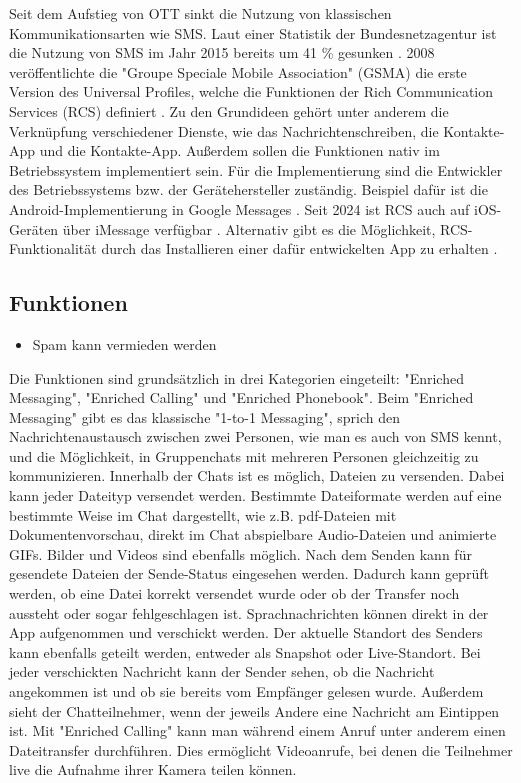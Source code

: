 \documentclass[conference]{IEEEtran}
\begin{document}
Seit dem Aufstieg von OTT sinkt die Nutzung von klassischen Kommunikationsarten wie SMS.
Laut einer Statistik der Bundesnetzagentur ist die Nutzung von SMS im Jahr 2015 bereits um 41 \% gesunken \cite{ottmobinter}.
2008 veröffentlichte die "Groupe Speciale Mobile Association" (GSMA) die erste Version des Universal Profiles, welche die Funktionen der Rich Communication Services (RCS) definiert \cite{rcsuite}.
Zu den Grundideen gehört unter anderem die Verknüpfung verschiedener Dienste, wie das Nachrichtenschreiben, die Kontakte-App und die Kontakte-App.
Außerdem sollen die Funktionen nativ im Betriebssystem implementiert sein.
Für die Implementierung sind die Entwickler des Betriebssystems bzw. der Gerätehersteller zuständig.
Beispiel dafür ist die Android-Implementierung in Google Messages \cite{googlemessages}.
Seit 2024 ist RCS auch auf iOS-Geräten über iMessage verfügbar \cite{applemessages}.
Alternativ gibt es die Möglichkeit, RCS-Funktionalität durch das Installieren einer dafür entwickelten App zu erhalten \cite{uniprof}.

\subsection{Funktionen}

\begin{itemize}
    \item Spam kann vermieden werden
\end{itemize}
\cite{uniprof}

Die Funktionen sind grundsätzlich in drei Kategorien eingeteilt: "Enriched Messaging", "Enriched Calling" und "Enriched Phonebook".
Beim "Enriched Messaging" gibt es das klassische "1-to-1 Messaging", sprich den Nachrichtenaustausch zwischen zwei Personen, wie man es auch von SMS kennt, und die Möglichkeit, in Gruppenchats mit mehreren Personen gleichzeitig zu kommunizieren.
Innerhalb der Chats ist es möglich, Dateien zu versenden.
Dabei kann jeder Dateityp versendet werden. Bestimmte Dateiformate werden auf eine bestimmte Weise im Chat dargestellt, wie z.B. pdf-Dateien mit Dokumentenvorschau, direkt im Chat abspielbare Audio-Dateien und animierte GIFs.
Bilder und Videos sind ebenfalls möglich.
Nach dem Senden kann für gesendete Dateien der Sende-Status eingesehen werden.
Dadurch kann geprüft werden, ob eine Datei korrekt versendet wurde oder ob der Transfer noch aussteht oder sogar fehlgeschlagen ist.
Sprachnachrichten können direkt in der App aufgenommen und verschickt werden.
Der aktuelle Standort des Senders kann ebenfalls geteilt werden, entweder als Snapshot oder Live-Standort.
Bei jeder verschickten Nachricht kann der Sender sehen, ob die Nachricht angekommen ist und ob sie bereits vom Empfänger gelesen wurde.
Außerdem sieht der Chatteilnehmer, wenn der jeweils Andere eine Nachricht am Eintippen ist.
Mit "Enriched Calling" kann man während einem Anruf unter anderem einen Dateitransfer durchführen.
Dies ermöglicht Videoanrufe, bei denen die Teilnehmer live die Aufnahme ihrer Kamera teilen können.
\end{document}
